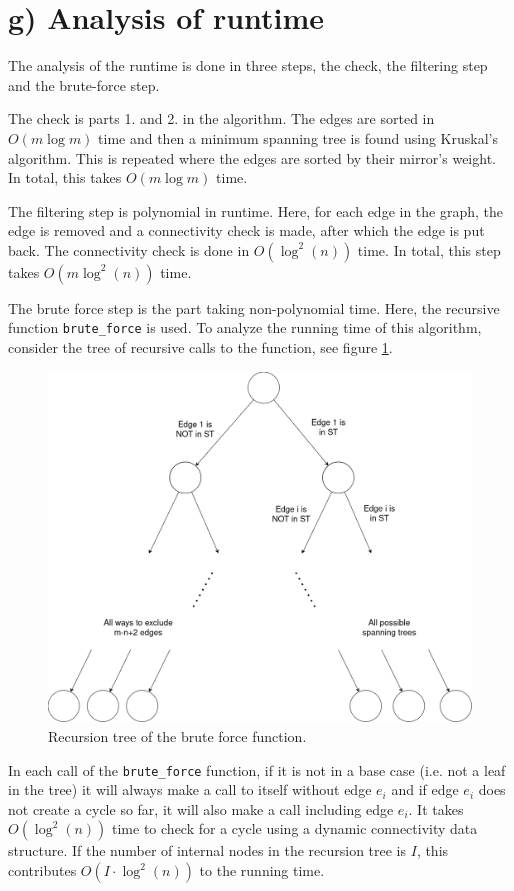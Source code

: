 \section*{g) Analysis of runtime}

The analysis of the runtime is done in three steps, the check, the filtering step and the brute-force step. 

The check is parts 1. and 2. in the algorithm. The edges are sorted in $O(m\log m)$ time and then a minimum spanning tree is found using Kruskal's algorithm. This is repeated where the edges are sorted by their mirror's weight. In total, this takes $O(m\log m)$ time. 

The filtering step is polynomial in runtime. Here, for each edge in the graph, the edge is removed and a connectivity check is made, after which the edge is put back. The connectivity check is done in $O(\log^2(n))$ time. In total, this step takes $O(m\log^2(n))$ time. 

The brute force step is the part taking non-polynomial time. Here, the recursive function \texttt{brute\_force} is used. To analyze the running time of this algorithm, consider the tree of recursive calls to the function, see figure \ref{fig:rec_tree}. 

\begin{figure}[ht!]
    \centering
    \includegraphics[width=0.8\linewidth]{Latex/Billeder/recursion_tree.png}
    \caption{Recursion tree of the brute force function. }
    \label{fig:rec_tree}
\end{figure}

In each call of the \texttt{brute\_force} function, if it is not in a base case (i.e. not a leaf in the tree) it will always make a call to itself without edge $e_i$ and if edge $e_i$ does not create a cycle so far, it will also make a call including edge $e_i$. It takes $O(\log^2(n))$ time to check for a cycle using a dynamic connectivity data structure. If the number of internal nodes in the recursion tree is $I$, this contributes $O(I\cdot\log^2(n))$ to the running time. 


